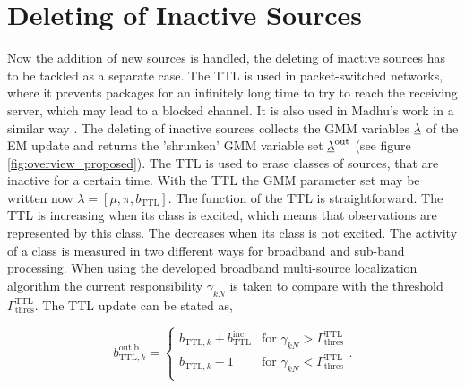 
\section{Deleting of Inactive Sources}
\label{sec:del}
Now the addition of new sources is handled, the deleting of inactive sources has to be tackled as a separate case. The \ac{TTL} is used in packet-switched networks, where it prevents packages for an infinitely long time to try to reach the receiving server, which may lead to a blocked channel. It is also used in Madhu's work in a similar way \cite[Chapter~4.3]{madhu2010acoustic}. The deleting of inactive sources collects the \ac{GMM} variables $\underline{\lambda}$ of the \ac{EM} update and returns the 'shrunken' \ac{GMM} variable set $\underline{\lambda}^{\text{out}}$ (see figure \ref{fig:overview_proposed}). The \ac{TTL} is used to erase classes of sources, that are inactive for a certain time.
With the \ac{TTL} the \ac{GMM} parameter set may be written now $\lambda = [\mu, \pi, b_\text{TTL}]$. The function of the \ac{TTL} is straightforward. The \ac{TTL} is increasing when its class is excited, which means that observations are represented by this class. The  decreases when its class is not excited. The activity of a class is measured in two different ways for broadband and sub-band processing. When using the developed broadband multi-source localization algorithm the current responsibility $\gamma_{kN}$ is taken to compare with the threshold $\Gamma^\text{TTL}_\text{thres}$. The \ac{TTL} update can be stated as,

\begin{equation}
b_{\text{TTL},k}^{\text{out,b}} =
	\begin{cases}
	    b_{\text{TTL},k} + b_{\text{TTL}}^\text{inc}	  				& \text{for } \gamma_{kN} > \Gamma^\text{TTL}_\text{thres}\\
	    b_{\text{TTL},k} - 1 	& \text{for } \gamma_{kN} < \Gamma^\text{TTL}_\text{thres}\\
	\end{cases}.
	\label{eq:ttl_add}
\end{equation}

